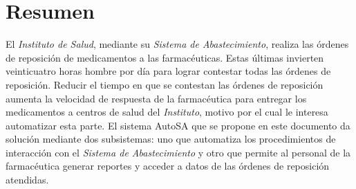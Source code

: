 \section{Resumen}
El \textit{Instituto de Salud}, mediante su \textit{Sistema de Abastecimiento}, realiza las órdenes de reposición de medicamentos a las farmacéuticas. Estas últimas invierten veinticuatro horas hombre por día para lograr contestar todas las órdenes de reposición. Reducir el tiempo en que se contestan las órdenes de reposición aumenta la velocidad de respuesta de la farmacéutica para entregar los medicamentos a centros de salud del \textit{Instituto}, motivo por el cual le interesa automatizar esta parte. El sistema AutoSA que se propone en este documento da solución mediante dos subsistemas: uno que automatiza los procedimientos de interacción con el \textit{Sistema de Abastecimiento} y otro que permite al personal de la farmacéutica generar reportes y acceder a datos de las órdenes de reposición atendidas.
